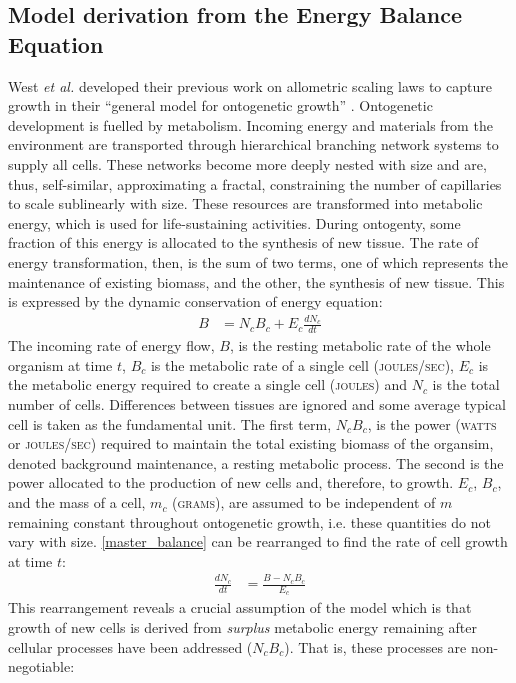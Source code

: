 \documentclass[a4paper]{article} %
\begin{document}
\subsection{Model derivation from the Energy Balance Equation}
West \textit{et al.} developed their previous work on allometric scaling laws \autocite{West1997} to capture growth in their ``general model for ontogenetic growth'' \autocite{West2001}. Ontogenetic development is fuelled by metabolism. Incoming energy and materials from the environment are transported through hierarchical branching network systems to supply all cells. These networks become more deeply nested with size and are, thus, self-similar, approximating a fractal, constraining the number of capillaries to scale sublinearly with size. These resources are transformed into metabolic energy, which is used for life-sustaining activities. During ontogenty, some fraction of this energy is allocated to the synthesis of new tissue. The rate of energy transformation, then, is the sum of two terms, one of which represents the maintenance of existing biomass, and the other, the synthesis of new tissue. This is expressed by the dynamic conservation of energy equation:
\begin{align}
    B &= N_{c}B_{c} + E_{c}\frac{dN_{c}}{dt} \label{master_balance}
\end{align}
The incoming rate of energy flow, $B$, is the resting metabolic rate of the whole organism at time $t$, $B_c$ is the metabolic rate of a single cell (\textsc{joules/sec}), $E_c$ is the metabolic energy required to create a single cell (\textsc{joules}) and $N_c$ is the total number of cells. Differences between tissues are ignored and some average typical cell is taken as the fundamental unit. The first term, $N_{c}B_{c}$, is the power (\textsc{watts} or \textsc{joules/sec}) required to maintain the total existing biomass of the organsim, denoted background maintenance, a resting metabolic process. The second is the power allocated to the production of new cells and, therefore, to growth. $E_c$, $B_c$, and the mass of a cell, $m_c$ (\textsc{grams}), are assumed to be independent of $m$ remaining constant throughout ontogenetic growth, i.e. these quantities do not vary with size. \eqref{master_balance} can be rearranged to find the rate of cell growth at time $t$: 
\begin{align}
    \frac{dN_{c}}{dt} &= \frac{B - N_{c}B_{c}}{E_{c}} \label{cell_rate}
\end{align}
This rearrangement reveals a crucial assumption of the model which is that growth of new cells is derived from \textit{surplus} metabolic energy remaining after cellular processes have been addressed ($N_{c}B_{c}$). That is, these processes are non-negotiable:
\end{document}
